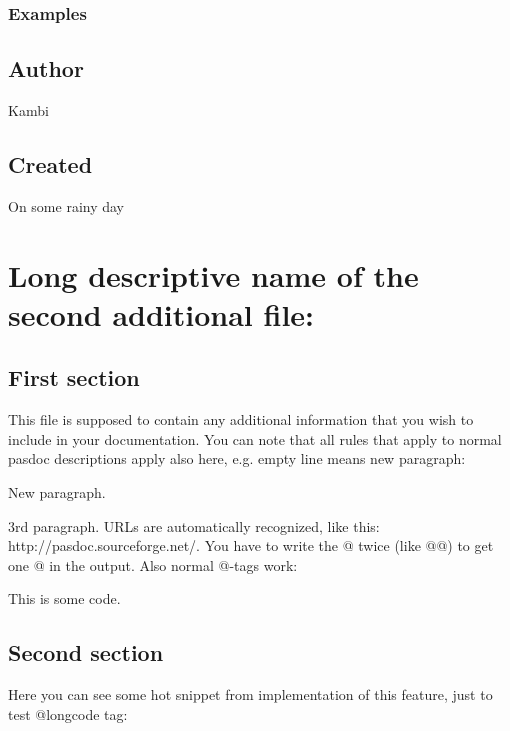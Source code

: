 \documentclass{report}
\begin{document}
\subsection*{Examples}
\section{Author}
\par
Kambi

\section{Created}
\par
On some rainy day


\chapter{Long descriptive name of the second additional file:}
 

 

\section{First section}


This file is supposed to contain any additional information that you wish to include in your documentation. You can note that all rules that apply to normal pasdoc descriptions apply also here, e.g. empty line means new paragraph:

New paragraph.

3rd paragraph. URLs are automatically recognized, like this: http://pasdoc.sourceforge.net/. You have to write the @ twice (like @@) to get one @ in the output. Also normal @{-}tags work: \begin{ttfamily}This is some code.\end{ttfamily}

\section{Second section}


Here you can see some hot snippet from implementation of this feature, just to test @longcode tag:
\end{document}
